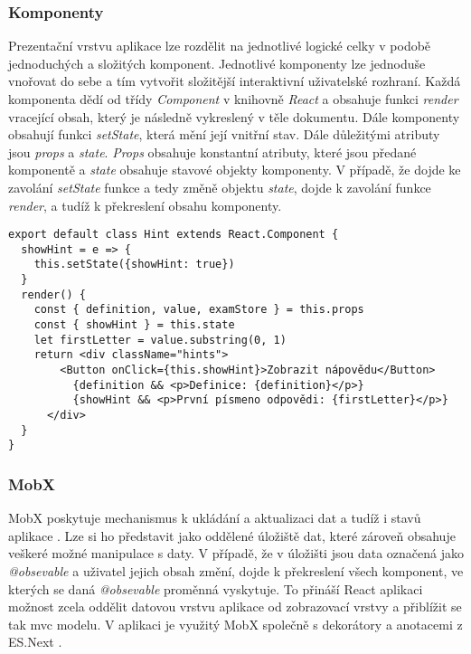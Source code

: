 \documentclass[a4paper,11pt,titlepage,fleqn]{article}
\begin{document}
        \subsubsection{Komponenty}
            Prezentační vrstvu aplikace lze rozdělit na jednotlivé logické celky v podobě jednoduchých a složitých komponent. Jednotlivé komponenty lze jednoduše vnořovat do sebe a tím vytvořit složitější interaktivní uživatelské rozhraní. Každá komponenta dědí od třídy \textit{Component} v knihovně \textit{React} a obsahuje funkci \textit{render} vracející obsah, který je následně vykreslený v těle dokumentu. Dále komponenty obsahují funkci \textit{setState}, která mění její vnitřní stav. Dále důležitými atributy jsou \textit{props} a \textit{state}. \textit{Props} obsahuje konstantní atributy, které jsou předané komponentě a \textit{state} obsahuje stavové objekty komponenty. V případě, že dojde ke zavolání \textit{setState} funkce a tedy změně objektu \textit{state}, dojde k zavolání funkce \textit{render}, a tudíž k překreslení obsahu komponenty\cite{bib:react}.

\begin{minipage}[c]{0.95\textwidth}
\begin{lstlisting}[language=JS, caption={Příklad komponenty pro zobrazování nápovědy při procvičování slovíček},label=code:hints]
export default class Hint extends React.Component {
  showHint = e => {
    this.setState({showHint: true})
  }
  render() {
    const { definition, value, examStore } = this.props
    const { showHint } = this.state
    let firstLetter = value.substring(0, 1)
    return <div className="hints">
        <Button onClick={this.showHint}>Zobrazit nápovědu</Button>
          {definition && <p>Definice: {definition}</p>}
          {showHint && <p>První písmeno odpovědi: {firstLetter}</p>}
      </div>
  }
}
\end{lstlisting}
\end{minipage}

        \subsubsection{MobX}
            \label{mobx}
            MobX poskytuje mechanismus k ukládání a aktualizaci dat a tudíž i stavů aplikace \cite{bib:mobx}. Lze si ho představit jako oddělené úložiště dat, které zároveň obsahuje veškeré možné manipulace s daty. V případě, že v úložišti jsou data označená jako \textit{@obsevable} a uživatel jejich obsah změní, dojde k překreslení všech komponent, ve kterých se daná \textit{@obsevable} proměnná vyskytuje. To přináší React aplikaci možnost zcela oddělit datovou vrstvu aplikace od zobrazovací vrstvy a přiblížit se tak \gls{mvc} modelu. V aplikaci je využitý MobX společně s dekorátory a anotacemi z ES.Next \cite{bib:mobx}. 
\end{document}
